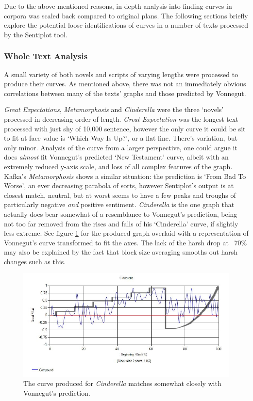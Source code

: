 \documentclass{article}
\begin{document}
        Due to the above mentioned reasons, in-depth analysis into finding curves in corpora was scaled back compared to original plans. The following sections briefly explore the potential loose identifications of curves in a number of texts processed by the Sentiplot tool.
        \subsubsection{Whole Text Analysis}
            A small variety of both novels and scripts of varying lengths were processed to produce their curves. As mentioned above, there was not an immediately obvious correlations between many of the texts' graphs and those predicted by Vonnegut. 
            
            \textit{Great Expectations}, \textit{Metamorphosis} and \textit{Cinderella} were the three `novels' processed in decreasing order of length. \textit{Great Expectation} was the longest text processed with just shy of 10,000 sentence, however the only curve it could be sit to fit at face value is `Which Way Is Up?', or a flat line. There's variation, but only minor. Analysis of the curve from a larger perspective, one could argue it does \textit{almost} fit Vonnegut's predicted `New Testament' curve, albeit with an extremely reduced y-axis scale, and loss of all complex features of the graph. Kafka's \textit{Metamorphosis} shows a similar situation: the prediction is `From Bad To Worse', an ever decreasing parabola of sorts, however Sentiplot's output is at closest match, neutral, but at worst seems to have a few peaks and troughs of particularly negative \textit{and} positive sentiment. \textit{Cinderella} is the one graph that actually does bear somewhat of a resemblance to Vonnegut's prediction, being not too far removed from the rises and falls of his `Cinderella' curve, if slightly less extreme. See figure \ref{fig:cinderellaComp} for the produced graph overlaid with a representation of Vonnegut's curve transformed to fit the axes. The lack of the harsh drop at ~70\% may also be explained by the fact that block size averaging smooths out harsh changes such as this.
            \begin{figure}[hbtp]
                \includegraphics[width=1\textwidth]{Figures/Curve/CinderellaComp}
                \centering
                \caption{The curve produced for \textit{Cinderella} matches somewhat closely with Vonnegut's prediction.} 
                \label{fig:cinderellaComp}
            \end{figure}
\end{document}
